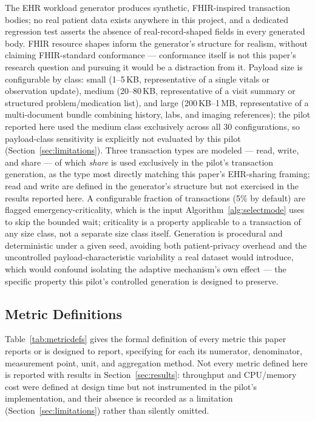 \documentclass[journal]{IEEEtran}
\begin{document}
The EHR workload generator produces synthetic, FHIR-inspired transaction bodies; no real patient data exists anywhere in this project, and a dedicated regression test asserts the absence of real-record-shaped fields in every generated body. FHIR resource shapes inform the generator's structure for realism, without claiming FHIR-standard conformance --- conformance itself is not this paper's research question and pursuing it would be a distraction from it. Payload size is configurable by class: small (1--5\,KB, representative of a single vitals or observation update), medium (20--80\,KB, representative of a visit summary or structured problem/medication list), and large (200\,KB--1\,MB, representative of a multi-document bundle combining history, labs, and imaging references); the pilot reported here used the medium class exclusively across all 30 configurations, so payload-class sensitivity is explicitly not evaluated by this pilot (Section~\ref{sec:limitations}). Three transaction types are modeled --- read, write, and share --- of which \emph{share} is used exclusively in the pilot's transaction generation, as the type most directly matching this paper's EHR-sharing framing; read and write are defined in the generator's structure but not exercised in the results reported here. A configurable fraction of transactions (5\% by default) are flagged emergency-criticality, which is the input Algorithm~\ref{alg:selectmode} uses to skip the bounded wait; criticality is a property applicable to a transaction of any size class, not a separate size class itself. Generation is procedural and deterministic under a given seed, avoiding both patient-privacy overhead and the uncontrolled payload-characteristic variability a real dataset would introduce, which would confound isolating the adaptive mechanism's own effect --- the specific property this pilot's controlled generation is designed to preserve.

\subsection{Metric Definitions}
\label{sec:metricdefs}

Table~\ref{tab:metricdefs} gives the formal definition of every metric this paper reports or is designed to report, specifying for each its numerator, denominator, measurement point, unit, and aggregation method. Not every metric defined here is reported with results in Section~\ref{sec:results}: throughput and CPU/memory cost were defined at design time but not instrumented in the pilot's implementation, and their absence is recorded as a limitation (Section~\ref{sec:limitations}) rather than silently omitted.
\end{document}
